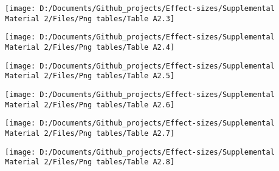 \documentclass[
  english,
  man]{apa6}
\begin{document}
\begin{sidewaysfigure}

{\centering \texttt{[image: D:/Documents/Github\_projects/Effect-sizes/Supplemental Material 2/Files/Png tables/Table A2.3]} 

}

\end{sidewaysfigure}

\begin{sidewaysfigure}

{\centering \texttt{[image: D:/Documents/Github\_projects/Effect-sizes/Supplemental Material 2/Files/Png tables/Table A2.4]} 

}

\end{sidewaysfigure}

\begin{sidewaysfigure}

{\centering \texttt{[image: D:/Documents/Github\_projects/Effect-sizes/Supplemental Material 2/Files/Png tables/Table A2.5]} 

}

\end{sidewaysfigure}

\begin{sidewaysfigure}

{\centering \texttt{[image: D:/Documents/Github\_projects/Effect-sizes/Supplemental Material 2/Files/Png tables/Table A2.6]} 

}

\end{sidewaysfigure}

\begin{sidewaysfigure}

{\centering \texttt{[image: D:/Documents/Github\_projects/Effect-sizes/Supplemental Material 2/Files/Png tables/Table A2.7]} 

}

\end{sidewaysfigure}

\begin{sidewaysfigure}

{\centering \texttt{[image: D:/Documents/Github\_projects/Effect-sizes/Supplemental Material 2/Files/Png tables/Table A2.8]} 

}

\end{sidewaysfigure}
\end{document}
